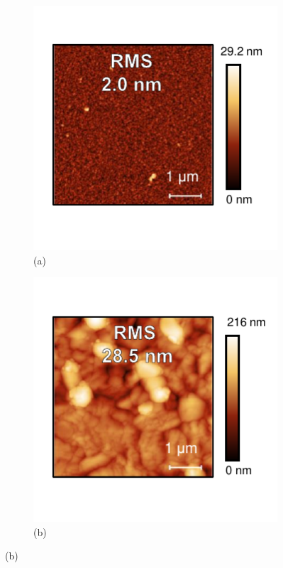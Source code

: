 \begin{figure}[htbp]
    \centering
    \begin{subfigure}[t]{0.45\textwidth}
        \centering
        \includegraphics[width=\textwidth]{chapters/material_properties/images/AFM_before.pdf} %
        \caption*{(a)}
    \end{subfigure}
    \hfill
    \begin{subfigure}[t]{0.45\textwidth}
        \centering
        \includegraphics[width=\textwidth]{chapters/material_properties/images/AFM_after.pdf} %
        \caption*{(b)}
    \end{subfigure}


\end{figure}
